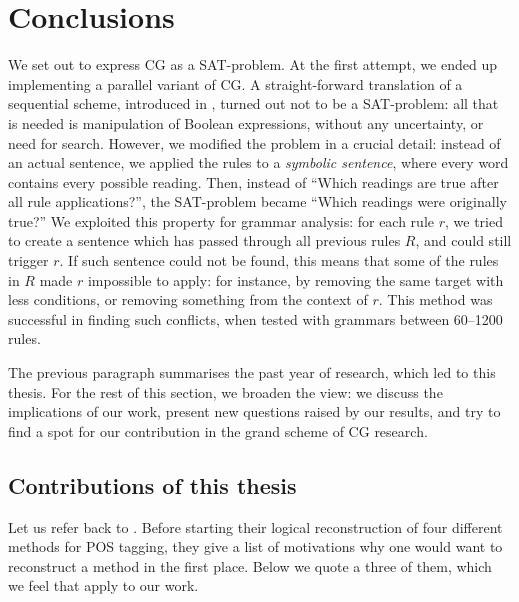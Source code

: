 \chapter{Conclusions}
\label{chapterConclusions}

We set out to express CG as a SAT-problem. 
At the first attempt, we ended up implementing a parallel variant of CG.
A straight-forward translation of a sequential scheme, introduced in \cite{lager_nivre01}, 
turned out not to be a SAT-problem: all that is needed is manipulation of Boolean expressions, 
without any uncertainty, or need for search. 
However, we modified the problem in a crucial detail: instead of an actual sentence, 
we applied the rules to a {\em symbolic sentence}, where every word contains every possible reading.
Then, instead of ``Which readings are true after all rule applications?'', the SAT-problem became ``Which readings were originally true?''
We exploited this property for grammar analysis: for each rule $r$, we tried to create a sentence 
which has passed through all previous rules $R$, and could still trigger $r$.
If such sentence could not be found, this means that some of the rules in $R$ made $r$ impossible to apply: for instance, by removing the same target with less conditions, or removing something from the context of $r$.
This method was successful in finding such conflicts, when tested with grammars between 60--1200 rules.

The previous paragraph summarises the past year of research, which led to this thesis. 
For the rest of this section, we broaden the view: we discuss the implications of our work, 
present new questions raised by our results, and try to find a spot for our contribution 
in the grand scheme of CG research.


\section{Contributions of this thesis}

Let us refer back to \cite{lager_nivre01}. 
Before starting their logical reconstruction of four different methods for POS tagging,
they give a list of motivations why one would want to reconstruct a method in the first place.
Below we quote a three of them, which we feel that apply to our work.

